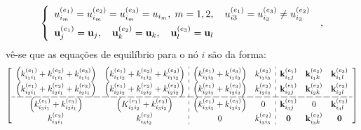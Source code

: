 \begin{equation} \left\{ \begin{array}{l}u_{i_m}^{(e_1)}=u_{i_m}^{(e_2)}=u_{i_m}^{(e_3)}=u_{i_m}, \; m=1,2, \quad  u_{i3}^{(e_1)}=u_{i_3}^{(e_3)}\neq u_{i_3}^{(e_2)}  \vspace{5pt} \\
		\mathbf{u}_{j}^{(e_1)}=\mathbf{u}_j, \quad  \mathbf{u}_{k}^{(e_2)}=\mathbf{u}_k , \quad \mathbf{u}_{l}^{(e_3)}=\mathbf{u}_l
	\end{array} \right. \; ,
\end{equation}
\noindent vê-se que as equações de equilíbrio para o nó \(i\) são da forma:
\begin{multline}\label{eq_rot1} \scalebox{0.85}{$
			\left[\begin{array}{cc:cc:ccc}
					\left( k_{i_1 i_1}^{(e_1)}+k_{i_1 i_1}^{(e_2)}+k_{i_1 i_1}^{(e_3)} \right) & \left( k_{i_1 i_2}^{(e_1)}+k_{i_1 i_2}^{(e_2)}+k_{i_1 i_2}^{(e_3)} \right) &
					\left( k_{i_1 i_3}^{(e_1)}+k_{i_1 i_3}^{(e_3)} \right)                     & k_{i_1 i_3}^{(e_2)}                                                        & \mathbf{k}_{i_1 j}^{(e_1)} & \mathbf{k}_{i_1 k}^{(e_2)} & \mathbf{k}_{i_1 l}^{(e_3)} \\
					\left( k_{i_2 i_1}^{(e_1)}+k_{i_2 i_1}^{(e_2)}+k_{i_2 i_1}^{(e_3)} \right) & \left( k_{i_2 i_2}^{(e_1)}+k_{i_2 i_2}^{(e_2)}+k_{i_2 i_2}^{(e_3)} \right) &
					\left( k_{i_2 i_3}^{(e_1)}+k_{i_2 i_3}^{(e_3)} \right)                     & k_{i_2 i_3}^{(e_2)}                                                        & \mathbf{k}_{i_2 j}^{(e_1)} & \mathbf{k}_{i_2 k}^{(e_2)} & \mathbf{k}_{i_2 l}^{(e_3)} \\ \hdashline[8pt/2pt]
					\left( k_{i_3 i_1}^{(e_1)}+k_{i_3 i_1}^{(e_3)} \right)                     & \left( K_{i_3 i_2}^{(e_1)}+k_{i_3 i_2}^{(e_3)} \right)                     &
					\left( k_{i_3 i_3}^{(e_1)}+k_{i_3 i_3}^{(e_3)} \right)                     & 0                                                                          & \mathbf{k}_{i_3 j}^{(e_1)} & 0                      & \mathbf{k}_{i_3 l}^{(e_3)} \\
					k_{i_3 i_1}^{(e_2)}                                                        & k_{i_3 i_2}^{(e_2)}                                                        &
					0                                                                          & k_{i_3 i_3}^{(e_2)}                                                        & \mathbf{0}                 & \mathbf{k}_{i_3 k}^{(e_2)} & \mathbf{0}\end{array} \right]  $}

\end{multline}
